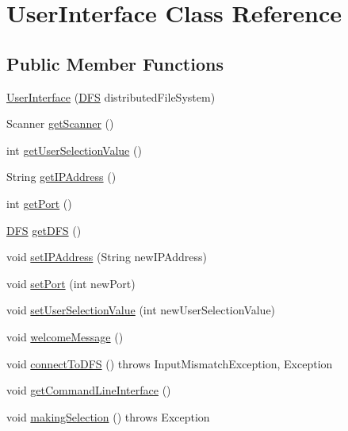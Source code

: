 \hypertarget{class_user_interface}{}\section{User\+Interface Class Reference}
\label{class_user_interface}
\subsection*{Public Member Functions}
\begin{DoxyCompactItemize}
\item 
\mbox{\hyperlink{class_user_interface_ae4be0a3dc956ead335dbb0c627847b1f}{User\+Interface}} (\mbox{\hyperlink{class_d_f_s}{D\+FS}} distributed\+File\+System)
\item 
Scanner \mbox{\hyperlink{class_user_interface_a73a95f25426d17a82f506bfa546ffc21}{get\+Scanner}} ()
\item 
int \mbox{\hyperlink{class_user_interface_ad83d86cf79d6766eaf8acbc4453c9abe}{get\+User\+Selection\+Value}} ()
\item 
String \mbox{\hyperlink{class_user_interface_a2fda154134eb10db7b184de5a6df5b23}{get\+I\+P\+Address}} ()
\item 
int \mbox{\hyperlink{class_user_interface_af046587dab904a279c4bde6df3fba567}{get\+Port}} ()
\item 
\mbox{\hyperlink{class_d_f_s}{D\+FS}} \mbox{\hyperlink{class_user_interface_a6ccb02994e74e468304c7c990d83913a}{get\+D\+FS}} ()
\item 
void \mbox{\hyperlink{class_user_interface_a4e49fde80d037d038d9c73db9d04e196}{set\+I\+P\+Address}} (String new\+I\+P\+Address)
\item 
void \mbox{\hyperlink{class_user_interface_af822b7fc2dbee940ad4892bd2e27d5ae}{set\+Port}} (int new\+Port)
\item 
void \mbox{\hyperlink{class_user_interface_ae26a8337ddbf851a470c112df194a768}{set\+User\+Selection\+Value}} (int new\+User\+Selection\+Value)
\item 
void \mbox{\hyperlink{class_user_interface_a8541dc8e6383dfdf708f3307b77d3e83}{welcome\+Message}} ()
\item 
void \mbox{\hyperlink{class_user_interface_ac366637e9291b357f85f67a58070e666}{connect\+To\+D\+FS}} ()  throws Input\+Mismatch\+Exception, Exception 
\item 
void \mbox{\hyperlink{class_user_interface_a18a2dc6897c3ef551c1d433116b712d1}{get\+Command\+Line\+Interface}} ()
\item 
void \mbox{\hyperlink{class_user_interface_a8f5f6e741f0ecc16317d6425fc13ae09}{making\+Selection}} ()  throws Exception 
\end{DoxyCompactItemize}


